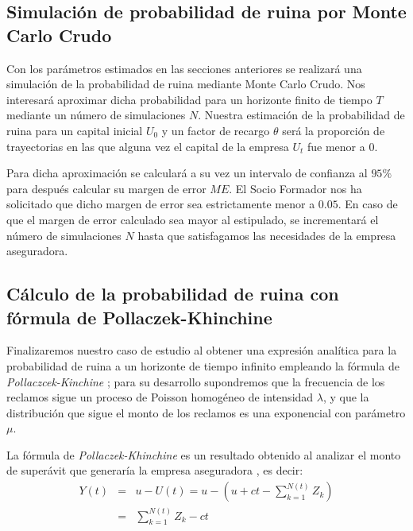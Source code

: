 \documentclass[journal]{IEEEtran}
\begin{document}
        \subsection{Simulación de probabilidad de ruina por Monte Carlo Crudo}

            Con los parámetros estimados en las secciones anteriores se realizará una simulación de la probabilidad de ruina mediante Monte Carlo Crudo. Nos interesará aproximar dicha probabilidad para un horizonte finito de tiempo $T$ mediante un número de simulaciones $N$. Nuestra estimación de la probabilidad de ruina para un capital inicial $U_0$ y un factor de recargo $\theta$ será la proporción de trayectorias en las que alguna vez el capital de la empresa $U_t$ fue menor a 0.

            Para dicha aproximación se calculará a su vez un intervalo de confianza al $95\%$ para después calcular su margen de error $ME$. El Socio Formador nos ha solicitado que dicho margen de error sea estrictamente menor a $0.05$. En caso de que el margen de error calculado sea mayor al estipulado, se incrementará el número de simulaciones $N$ hasta que satisfagamos las necesidades de la empresa aseguradora.

        \subsection{Cálculo de la probabilidad de ruina con fórmula de Pollaczek-Khinchine} \label{sec:pollaczek}

            Finalizaremos nuestro caso de estudio al obtener una expresión analítica para la probabilidad de ruina a un horizonte de tiempo infinito empleando la fórmula de \emph{Pollaczcek-Kinchine} \cite{josafat-santana-2020}; para su desarrollo supondremos que la frecuencia de los reclamos sigue un proceso de Poisson homogéneo de intensidad $\lambda$, y que la distribución que sigue el monto de los reclamos es una exponencial con parámetro $\mu$.

            La fórmula de \emph{Pollaczek-Khinchine} es un resultado obtenido al analizar el monto de superávit que generaría la empresa aseguradora \cite{burnecki2005best}, es decir:
            \begin{eqnarray*}
                Y(t) &=& u - U(t) = u-(u+ct-\sum_{k=1}^{N(t)} {Z_k}) \\
                &=& \sum_{k=1}^{N(t)} {Z_k} - ct
            \end{eqnarray*}
\end{document}
